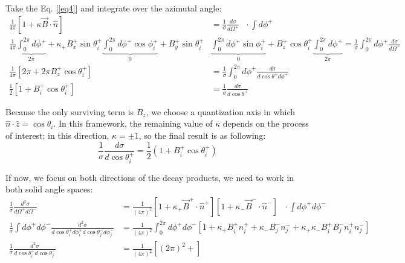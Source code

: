 \documentclass[onecolumn, amsmath, amssymb, aps, prd]{revtex4-2}
\begin{document}
			Take the Eq. [\ref{eq4}] and integrate over the azimutal angle:
			\begin{equation}
				\begin{split}
					\frac{1}{4\pi} \left[ 1 + \kappa \vec{B} \cdot \hat{n} \right] & = \frac{1}{\sigma} \frac{d\sigma}{d\Omega^+} \ \ \ \cdot \int d\phi^+ \\
					\frac{1}{4\pi} \underbrace{\int_0^{2\pi} d\phi^+}_{2\pi} + \kappa_+ B_x^+ \sin \theta_i^+ \underbrace{\int_0^{2\pi} d\phi^+ \cos \phi_i^+}_{0} 	+ B_y^+ \sin \theta_i^+ & \underbrace{\int_0^{2\pi} d\phi^+ \sin \phi_i^+}_{0} + B_z^+ \cos \theta_i^+ \underbrace{\int_0^{2\pi} d\phi^+}_{2\pi} = \frac{1}{\sigma} \int_0^{2\pi} d\phi^+ \frac{d\sigma}{d\Omega^+} \\
					\frac{1}{4\pi} \left[ 2\pi + 2\pi B_z^+ \cos \theta_i^+ \right]& = \frac{1}{\sigma} \int_0^{2\pi} d\phi^+ \frac{d\sigma}{d\cos \theta^+ d\phi^+} \\
					\frac{1}{2} \left[ 1 + B_i^+ \cos \theta_i^+ \right] & = \frac{1}{\sigma} \frac{d\sigma}{d\cos \theta^+}
				\end{split}
			\end{equation}

			Because the only surviving term is $B_z$, we choose a quantization axis in which $\hat{n} \cdot \hat{z} = \cos \theta_i$. In this framework, the remaining value of $\kappa$ depends on the process of interest; in this direction, $\kappa = \pm 1$, so the final result is as following:
			\begin{equation}
				\frac{1}{\sigma} \frac{d\sigma}{d\cos \theta_i^+} = \frac{1}{2} \left( 1 + B_i^+ \cos \theta_i^+ \right)
			\end{equation}

			If now, we focus on both directions of the decay products, we need to work in both solid angle spaces:
			\begin{equation}
				\begin{split}
					\frac{1}{\sigma} \frac{d^2\sigma}{d\Omega^+ d\Omega^-} & = \frac{1}{(4\pi)^2} \left[ 1+\kappa_+ \vec{B}^+ \cdot \hat{n}^+ \right] \left[ 1 + \kappa_- \vec{B}^- \cdot \hat{n}^- \right] \ \ \ \cdot \int d\phi^+ d\phi^- \\
					\frac{1}{\sigma} \int d\phi^+ d\phi^- \frac{d^2\sigma}{d\cos \theta_i^+ d\phi_i^+ d\cos \theta_j^- d\phi_j^-} & = \frac{1}{(4\pi)^2} \int_0^{2\pi} d\phi^+ d\phi^-\left[ 1+\kappa_+
					B_i^+ n_i^+ + \kappa_- B_j^- n_j^- + \kappa_+ \kappa_- B_i^+ B_j^- n_i^+ n_j^- \right]  \\
					\frac{1}{\sigma} \frac{d^2 \sigma}{d\cos \theta_i^+ d\cos \theta_j^-} & = \frac{1}{(4\pi)^2} \left[ (2\pi)^2 +  \right]
				\end{split}
			\end{equation}
\end{document}
